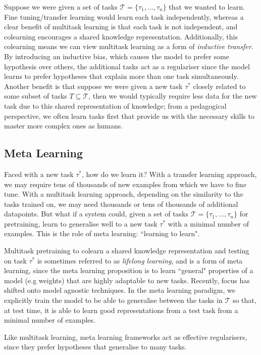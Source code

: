 Suppose we were given a set of tasks $\mathcal{T} = \{\tau_1, \dots, \tau_n\}$ that we wanted to learn. Fine tuning/transfer learning would learn each task independently, whereas a clear benefit of multitask learning is that each task is not independent, and colearning encourages a shared knowledge representation. Additionally, this colearning means we can view multitask learning as a form of \textit{inductive transfer}. By introducing an inductive bias, which causes the model to prefer some hypothesis over others, the additional tasks act as a regulariser since the model learns to prefer hypotheses that explain more than one task simultaneously. Another benefit is that suppose we were given a new task $\tau^*$ closely related to some subset of tasks $T \subseteq \mathcal{T}$, then we would typically require less data \cite{Caruana1997} for the new task due to this shared representation of knowledge; from a pedagogical perspective, we often learn tasks first that provide us with the necessary skills to master more complex ones as humans.

\subsection{Meta Learning} \label{section:intro:introtometa}
Faced with a new task $\tau^*$, how do we learn it? With a transfer learning approach, we may require tens of thousands of new examples from which we have to fine tune. With a multitask learning approach, depending on the similarity to the tasks trained on, we may need thousands or tens of thousands of additional datapoints. But what if a system could, given a set of tasks $\mathcal{T} = \{\tau_1, \dots, \tau_n\}$ for pretraining, learn to generalise well to a new task $\tau^*$ with a minimal number of examples. This is the role of meta learning: ``learning to learn".

Multitask pretraining to colearn a shared knowledge representation and testing on task $\tau^*$ is sometimes referred to as \textit{lifelong learning}, and is a form of meta learning, since the meta learning proposition is to learn ``general" properties of a model (e.g weights) that are highly adaptable to new tasks. Recently, focus has shifted onto model agnostic techniques. In the meta learning paradigm, we explicitly train the model to be able to generalise between the tasks in $\mathcal{T}$ so that, at test time, it is able to learn good representations from a test task from a minimal number of examples.

Like multitask learning, meta learning frameworks act as effective regularisers, since they prefer hypotheses that generalise to many tasks.

